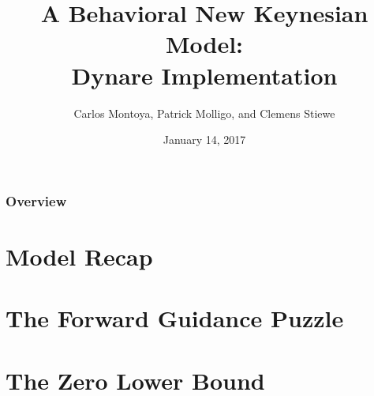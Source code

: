 \documentclass{beamer}
\title[A Behavioral New Keynesian Model]{A Behavioral New Keynesian Model: \\Dynare Implementation} %
\author[Current Research in Macroeconomics]{Carlos Montoya, Patrick Molligo, and Clemens Stiewe } %
\institute[] %
{
\\Current Research in Macroeconomics%
\medskip
\textit{} %
}
\date{January 14, 2017} %
\begin{document}
	
\begin{frame}
	\titlepage %
\end{frame}


\begin{frame}
	\frametitle{Overview} %
	\tableofcontents %
\end{frame}


\section{Model Recap} %
\section{The Forward Guidance Puzzle}
\section{The Zero Lower Bound}

\end{document}
